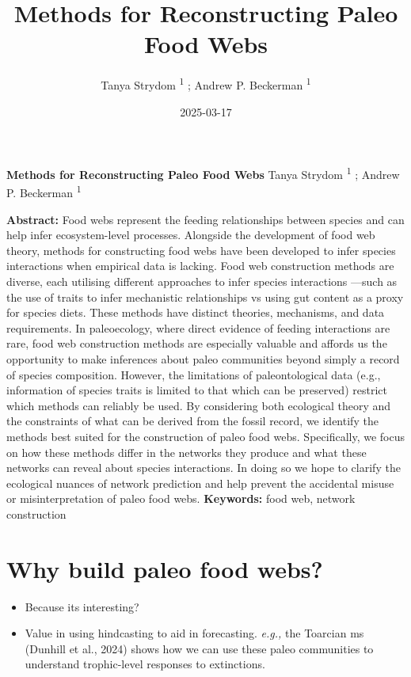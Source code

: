 \documentclass[
]{article}
\title{Methods for Reconstructing Paleo Food Webs}
\author{Tanya Strydom %
%
\textsuperscript{%
%
1%
}%
; Andrew P. Beckerman %
%
\textsuperscript{%
%
1%
}%
}
\date{2025-03-17}
\begin{document}
\thispagestyle{empty}
{\bfseries\sffamily\Large Methods for Reconstructing Paleo Food Webs}
\vfil
Tanya Strydom %
%
\textsuperscript{%
%
1%
}%
; Andrew P. Beckerman %
%
\textsuperscript{%
%
1%
}%

\vfil
{\small
\textbf{Abstract:} Food webs represent the feeding relationships between
species and can help infer ecosystem-level processes. Alongside the
development of food web theory, methods for constructing food webs have
been developed to infer species interactions when empirical data is
lacking. Food web construction methods are diverse, each utilising
different approaches to infer species interactions ---such as the use of
traits to infer mechanistic relationships vs using gut content as a
proxy for species diets. These methods have distinct theories,
mechanisms, and data requirements. In paleoecology, where direct
evidence of feeding interactions are rare, food web construction methods
are especially valuable and affords us the opportunity to make
inferences about paleo communities beyond simply a record of species
composition. However, the limitations of paleontological data (e.g.,
information of species traits is limited to that which can be preserved)
restrict which methods can reliably be used. By considering both
ecological theory and the constraints of what can be derived from the
fossil record, we identify the methods best suited for the construction
of paleo food webs. Specifically, we focus on how these methods differ
in the networks they produce and what these networks can reveal about
species interactions. In doing so we hope to clarify the ecological
nuances of network prediction and help prevent the accidental misuse or
misinterpretation of paleo food webs.
\vfil
\textbf{Keywords:} %
food web, %
network construction%
}
\clearpage
\setcounter{page}{1}
\doublespacing
\linenumbers


\section{Why build paleo food webs?}\label{why-build-paleo-food-webs}

\begin{itemize}
\item
  Because its interesting?
\item
  Value in using hindcasting to aid in forecasting. \emph{e.g.,} the
  Toarcian ms (Dunhill et al., 2024) shows how we can use these paleo
  communities to understand trophic-level responses to extinctions.
\end{itemize}
\end{document}
